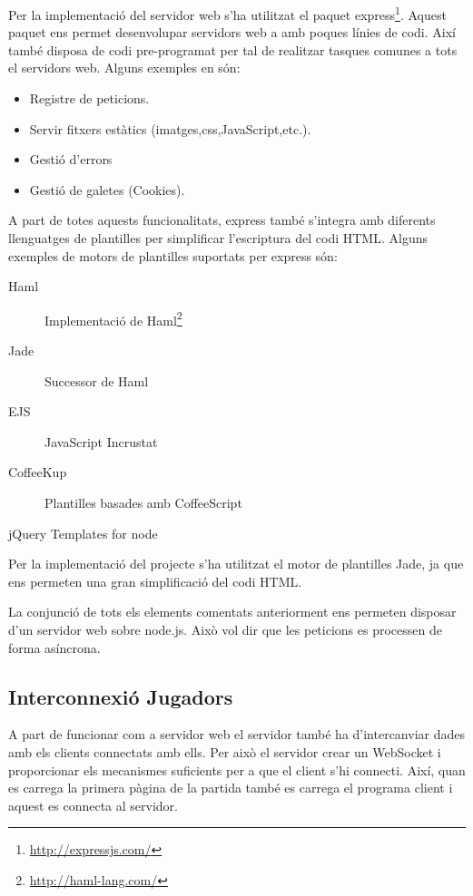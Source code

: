 Per la implementació del servidor web s'ha utilitzat el paquet express\footnote{\url{http://expressjs.com/}}. Aquest paquet ens permet desenvolupar servidors web a amb poques línies de codi. Així també disposa de codi pre-programat per tal de realitzar tasques comunes a tots el servidors web. Alguns exemples en són:

\begin{itemize}
\item{Registre de peticions.}
\item{Servir fitxers estàtics (imatges,css,JavaScript,etc.).}
\item{Gestió d'errors}
\item{Gestió de galetes (Cookies).}
\end{itemize}

A part de totes aquests funcionalitats, express també s'integra amb diferents llenguatges de plantilles per simplificar l'escriptura del codi HTML. Alguns exemples de motors de plantilles suportats per express són: 

\begin{description}
\item[Haml] {Implementació de Haml\footnote{\url{http://haml-lang.com/}} }
\item[Jade] {Successor de Haml}
\item[EJS] {JavaScript Incrustat}
\item[CoffeeKup] {Plantilles basades amb CoffeeScript}
\item[jQuery Templates for node]
\end{description}

Per la implementació del projecte s'ha utilitzat el motor de plantilles Jade, ja que ens permeten una gran simplificació del codi HTML.

La conjunció de tots els elements comentats anteriorment ens permeten disposar d'un servidor web sobre node.js. Això vol dir que les peticions es processen de forma asíncrona. 

\subsection{Interconnexió Jugadors}
\label{sec:interconnexio-jugadors}
A part de funcionar com a servidor web el servidor també ha d'intercanviar dades amb els clients connectats amb ells. Per això el servidor crear un WebSocket i proporcionar els mecanismes suficients per a que el client s'hi connecti. Així, quan es carrega la primera pàgina de la partida també es carrega el programa client i aquest es connecta al servidor. 

